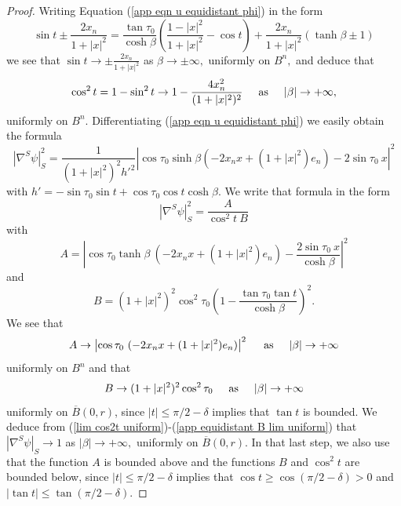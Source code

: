 \documentclass[10pt,reqno,oneside]{amsart}
\theoremstyle{definition}
\theoremstyle{remark}
\begin{document}
\begin{proof}
Writing Equation (\ref{app eqn u equidistant phi}) in the form
$$\sin t\pm \frac{2x_n}{1+|x|^2}=\frac{\tan\tau_0}{\cosh\beta}\left(\frac{1-|x|^2}{1+|x|^2}-\cos t\right)+\frac{2x_n}{1+|x|^2}(\tanh\beta\pm 1)$$
we see that $\sin t\rightarrow \pm \frac{2x_n}{1+|x|^2}$ as $\beta\rightarrow\pm\infty,$ uniformly on $B^n,$ and deduce that
\begin{equation}\label{lim cos2t uniform}
\cos^2t=1-\sin^2 t\rightarrow 1- \frac{4x_n^2}{(1+|x|^2)^2}\hspace{.5cm}\mbox{as}\hspace{.5cm}|\beta|\rightarrow +\infty,
\end{equation}
uniformly on $B^n.$ Differentiating (\ref{app eqn u equidistant phi}) we easily obtain the formula
$$|\nabla^S\psi|_S^2=\frac{1}{(1+|x|^2)^2h'^2}\left|\cos\tau_0\sinh\beta(-2x_nx+(1+|x|^2)e_n)-2\sin\tau_0\ x\right|^2$$
with $h'=-\sin\tau_0\sin t+\cos\tau_0\cos t\cosh\beta.$ We write that formula in the form
\begin{equation}\label{app equidistant nabla u A B}
|\nabla^S\psi|_S^2=\frac{A}{\cos^2t\ B}
\end{equation}
with
$$A=\left|\cos\tau_0\tanh\beta\ (-2x_nx+(1+|x|^2)e_n)-\frac{2\sin\tau_0\ x}{\cosh\beta}\right|^2$$
and
$$B=(1+|x|^2)^2\cos^2\tau_0\left(1-\frac{\tan\tau_0\tan t}{\cosh\beta}\right)^2.$$
We see that
\begin{equation}\label{app equidistant A lim uniform}
A\rightarrow \left|\cos\tau_0\ (-2x_nx+(1+|x|^2)e_n)\right|^2\hspace{.5cm}\mbox{as}\hspace{.5cm}|\beta|\rightarrow+\infty
\end{equation}
uniformly on $B^n$ and that
\begin{equation}\label{app equidistant B lim uniform}
B\rightarrow (1+|x|^2)^2\cos^2\tau_0\hspace{.5cm}\mbox{as}\hspace{.5cm}|\beta|\rightarrow+\infty
\end{equation}
uniformly on $\overline{B}(0,r)$, since $|t|\leq\pi/2-\delta$ implies that $\tan t$ is bounded. We deduce from (\ref{lim cos2t uniform})-(\ref{app equidistant B lim uniform}) that $|\nabla^S\psi|_S\rightarrow 1$ as $|\beta|\rightarrow+\infty,$ uniformly on $\overline{B}(0,r).$ In that last step, we also use that the function $A$ is bounded above and the functions $B$ and $\cos^2t$ are bounded below, since $|t|\leq\pi/2-\delta$ implies that $\cos t\geq\cos(\pi/2-\delta)>0$ and $|\tan t|\leq\tan(\pi/2-\delta).$
\end{proof}
\end{document}
